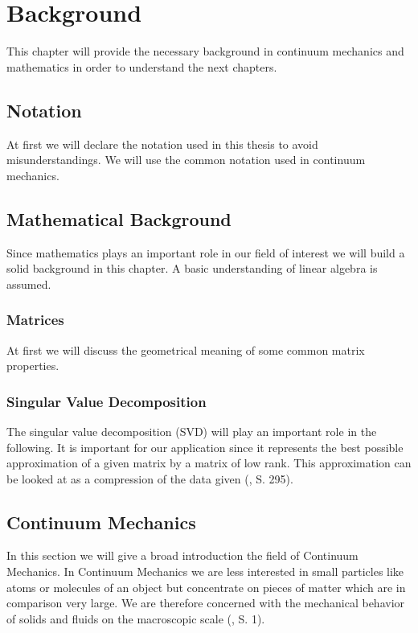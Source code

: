 \chapter{Background} \label{c:background}

This chapter will provide the necessary background in continuum mechanics and mathematics in order to understand the next chapters.

\section{Notation}
At first we will declare the notation used in this thesis to avoid misunderstandings. We will use the common notation used in continuum mechanics.

\section{Mathematical Background}

Since mathematics plays an important role in our field of interest we will build a solid background in this chapter. A basic understanding of linear algebra is assumed.

\subsection{Matrices}
At first we will discuss the geometrical meaning of some common matrix properties.


\subsection{Singular Value Decomposition}

The singular value decomposition (SVD) will play an important role in the following. It is important for our application since it represents the best possible approximation of a given matrix by a matrix of low rank. This approximation can be looked at as a compression of the data given (\cite{LiesenMehrmann2015}, S. 295).

\section{Continuum Mechanics}
In this section we will give a broad introduction the field of Continuum Mechanics.
In Continuum Mechanics we are less interested in small particles like atoms or molecules of an object but concentrate on pieces of matter which are in comparison very large. We are therefore concerned with the mechanical behavior of solids and fluids on the macroscopic scale (\cite{Spencer1980}, S. 1).

